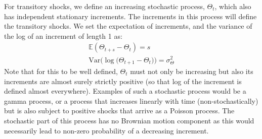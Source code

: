 For transitory shocks, we define an increasing stochastic process, $\Theta_t$, which also has independent stationary increments. The increments in this process will define the transitory shocks. We set the expectation of increments, and the variance of the log of an increment of length 1 as:
\begin{align*}
\mathbb{E}(\Theta_{t+s}-\Theta_t) = s \\
\mathrm{Var}\Big( \log\big(\Theta_{t+1}-\Theta_t\big)  \Big) = \sigma^2_{\Theta}
\end{align*}
Note that for this to be well defined, $\Theta_t$ must not only be increasing but also its increments are almost surely strictly positive (so that log of the increment is defined almost everywhere). Examples of such a stochastic process would be a gamma process, or a process that increases linearly with time (non-stochastically) but is also subject to positive shocks that arrive as a Poisson process. The stochastic part of this process has no Brownian motion component as this would necessarily lead to non-zero probability of a decreasing increment.

